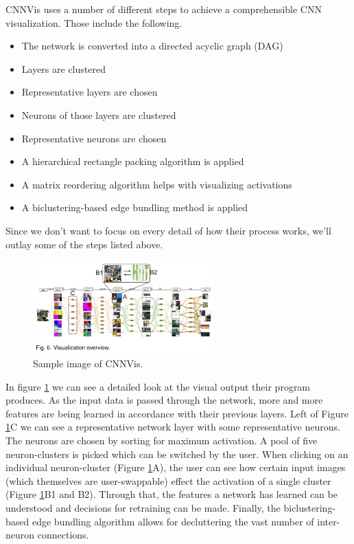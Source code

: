 \documentclass{acmsiggraph}               %
\begin{document}
CNNVis uses a number of different steps to achieve a comprehensible CNN visualization. Those include the following.

\begin{itemize}
  \item The network is converted into a directed acyclic graph (DAG)
  \item Layers are clustered
  \item Representative layers are chosen
  \item Neurons of those layers are clustered
  \item Representative neurons are chosen
  \item A hierarchical rectangle packing algorithm is applied
  \item A matrix reordering algorithm helps with visualizing activations
  \item A biclustering-based edge bundling method is applied
\end{itemize}

Since we don't want to focus on every detail of how their process works, we'll outlay some of the steps listed above.\\

\begin{figure}
  \centering
  \includegraphics[width=2.75in]{cnnvis_detail}
  \caption{Sample image of CNNVis. \protect\cite{Liu2016}}
  \label{fig:cnnvis_detail}
\end{figure}

In figure \ref{fig:cnnvis_detail} we can see a detailed look at the visual output their program produces. As the input data is passed through the network, more and more features are being learned in accordance with their previous layers. Left of Figure \ref{fig:cnnvis_detail}C we can see a representative network layer with some representative neurons. The neurons are chosen by sorting for maximum activation. A pool of five neuron-clusters is picked which can be switched by the user. When clicking on an individual neuron-cluster (Figure \ref{fig:cnnvis_detail}A), the user can see how certain input images (which themselves are user-swappable) effect the activation of a single cluster (Figure \ref{fig:cnnvis_detail}B1 and B2). Through that, the features a network has learned can be understood and decisions for retraining can be made. Finally, the biclustering-based edge bundling algorithm allows for decluttering the vast number of inter-neuron connections.\\
\end{document}
